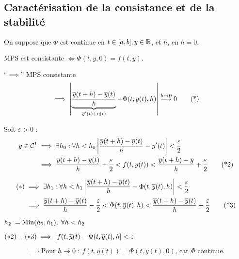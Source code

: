\subsection{Caractérisation de la consistance et de la stabilité}

On suppose que $\Phi$ est continue en $t\in[a,b], y \in \mathbb{R}$, et $h$, en $h=0$.

\begin{prop}
    MPS est consistante $\iff \Phi(t,y,0) = f(t,y)$.
\end{prop}

\begin{preuve}
    ``$\implies$'' MPS consistante 
    \begin{equation}
        \implies \left\lvert\underbrace{\frac{\overline{y}(t+h) - \overline{y}(t)}{h}}_{\overline{y}'(t) + o(t)}
        - \Phi(t,\overline{y}(t),h)\right\rvert \overset{h\to0}{\longrightarrow} 0
        \tag{*}
    \end{equation}

    Soit $\varepsilon > 0$ :
        \begin{align}
            \overline{y} \in \mathcal{C}^1 & \implies \exists h_0 : \forall h < h_0
            \left\lvert\frac{\overline{y}(t+h)-\overline{y}(t)}{h} - \overline{y}'(t)\right\rvert < \frac{\varepsilon}{2}
            \notag
            \\
            & \implies \frac{\overline{y}(t+h) - \overline{y}(t)}{h} - \frac{\varepsilon}{2} < f(t,y(t)) < \frac{\overline{y}(t+h) - \overline{y}}{h} + \frac{\varepsilon}{2}
            \tag{*2}
        \end{align}

        \begin{align}
            (*) & \implies \exists h_1 : \forall h < h_1 \left\lvert\frac{\overline{y}(t+h) - \overline{y}(t)}{h} - \Phi(t,\overline{y}(t),h)\right\rvert < \frac{\varepsilon}{2}
            \notag
            \\
            & \implies \frac{\overline{y}(t+h) - \overline{y}(t)}{h} - \frac{\varepsilon}{2} < \Phi(t,\overline{y}(t),h) < \frac{\overline{y}(t+h) - \overline{y}(t)}{h} + \frac{\varepsilon}{2}
            \tag{*3}
        \end{align}

        \vspace{0.5cm}
        $h_2 := \operatorname{Min}(h_0,h_1), \; \forall h < h_2$

        $(*2) - (*3) \implies \left\lvert f(t,\overline{y}(t) - \Phi(t,\overline{y}(t),h\right\rvert < \varepsilon$

        \begin{equation}
            \implies \text{Pour $h \to 0$ : $f(t,y(t)) = \Phi(t,\overline{y}(t),0)$, car $\Phi$ continue.}
            \tag{*4}
        \end{equation}


\end{preuve}
